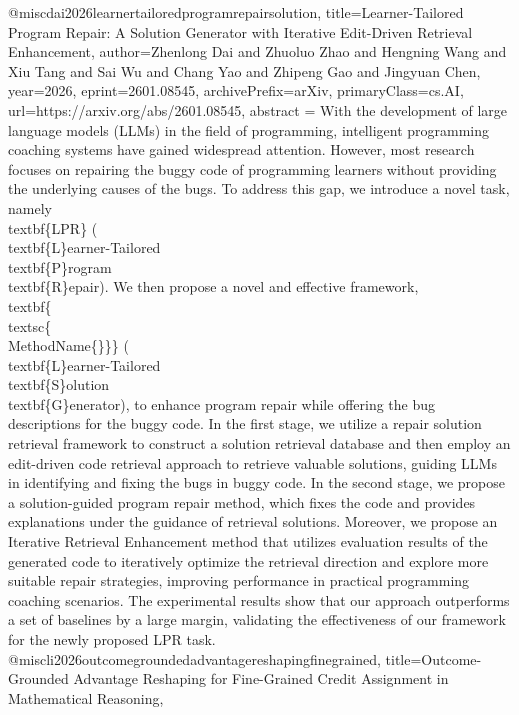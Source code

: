 {}@misc{dai2026learnertailoredprogramrepairsolution,
      title={Learner-Tailored Program Repair: A Solution Generator with Iterative Edit-Driven Retrieval Enhancement}, 
      author={Zhenlong Dai and Zhuoluo Zhao and Hengning Wang and Xiu Tang and Sai Wu and Chang Yao and Zhipeng Gao and Jingyuan Chen},
      year={2026},
      eprint={2601.08545},
      archivePrefix={arXiv},
      primaryClass={cs.AI},
      url={https://arxiv.org/abs/2601.08545},
      abstract = {With the development of large language models (LLMs) in the field of programming, intelligent programming coaching systems have gained widespread attention. However, most research focuses on repairing the buggy code of programming learners without providing the underlying causes of the bugs. To address this gap, we introduce a novel task, namely \\textbf\{LPR\} (\\textbf\{L\}earner-Tailored \\textbf\{P\}rogram \\textbf\{R\}epair). We then propose a novel and effective framework, \\textbf\{\\textsc\{\\MethodName\{\}\}\} (\\textbf\{L\}earner-Tailored \\textbf\{S\}olution \\textbf\{G\}enerator), to enhance program repair while offering the bug descriptions for the buggy code. In the first stage, we utilize a repair solution retrieval framework to construct a solution retrieval database and then employ an edit-driven code retrieval approach to retrieve valuable solutions, guiding LLMs in identifying and fixing the bugs in buggy code. In the second stage, we propose a solution-guided program repair method, which fixes the code and provides explanations under the guidance of retrieval solutions. Moreover, we propose an Iterative Retrieval Enhancement method that utilizes evaluation results of the generated code to iteratively optimize the retrieval direction and explore more suitable repair strategies, improving performance in practical programming coaching scenarios. The experimental results show that our approach outperforms a set of baselines by a large margin, validating the effectiveness of our framework for the newly proposed LPR task.}
}@misc{li2026outcomegroundedadvantagereshapingfinegrained,
      title={Outcome-Grounded Advantage Reshaping for Fine-Grained Credit Assignment in Mathematical Reasoning}, 
}
